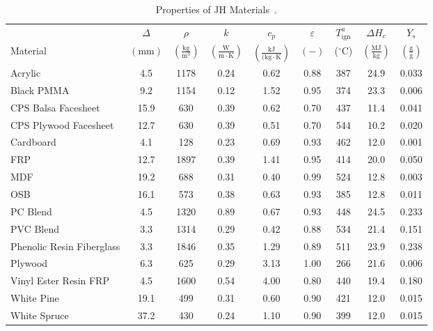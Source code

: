 \begin{table}[!h]
\caption[Properties of JH Materials]{Properties of JH Materials~\cite{Luo:FRA2019,Lattimer:NIJ19}.}
\centering
\begin{tabular}{|l|c|c|c|c|c|c|c|c|}
\hline
            & \centering$\Delta$& \centering$\rho$& \centering$k$& \centering$c_{p}$& \centering$\varepsilon$& \centering$T_{\mathrm{ign}}^{a}$&\centering$\Delta H_{c}$& $Y_{s}$ \\
Material    & \centering$\mathrm{\left(mm\right)}$ & \centering$\mathrm{\left(\frac{kg}{m^{3}}\right)}$ & \centering$\mathrm{\left(\frac{W}{m\cdot K}\right)}$ & \centering$\mathrm{\left(\frac{kJ}{(kg\cdot K}\right)}$ & \centering$\mathrm{( - )}$ &  \centering($\mathrm{^{\circ}C}$)   & \centering$\left(\mathrm{\frac{MJ}{kg}}\right)$ & $\mathrm{\left(\frac{g}{g}\right)}$ \\ \hline
\hline
Acrylic                                           & 4.5  & 1178 & 0.24 & 0.62 & 0.88 & 387 & 24.9 & 0.033 \\\hline
Black PMMA                                        & 9.2  & 1154 & 0.12 & 1.52 & 0.95 & 374 & 23.3 & 0.006 \\\hline
CPS Balsa Facesheet                               & 15.9 & 630  & 0.39 & 0.62 & 0.70 & 437 & 11.4 & 0.041 \\\hline
CPS Plywood Facesheet                             & 12.7 & 630  & 0.39 & 0.51 & 0.70 & 544 & 10.2 & 0.020 \\\hline
Cardboard                                         & 4.1  & 128  & 0.23 & 0.69 & 0.93 & 462 & 12.0 & 0.001 \\\hline
FRP                                               & 12.7 & 1897 & 0.39 & 1.41 & 0.95 & 414 & 20.0 & 0.050 \\\hline
MDF                                               & 19.2 & 688  & 0.31 & 0.40 & 0.99 & 524 & 12.8 & 0.003 \\\hline
OSB                                               & 16.1 & 573  & 0.38 & 0.63 & 0.93 & 385 & 12.8 & 0.011 \\\hline
PC Blend                                          & 4.5  & 1320 & 0.89 & 0.67 & 0.93 & 448 & 24.5 & 0.233 \\\hline
PVC Blend                                         & 3.3  & 1314 & 0.29 & 0.42 & 0.88 & 534 & 21.4 & 0.151 \\\hline
Phenolic Resin Fiberglass                         & 3.3  & 1846 & 0.35 & 1.29 & 0.89 & 511 & 23.9 & 0.238 \\\hline
Plywood                                           & 6.3  & 625  & 0.29 & 3.13 & 1.00 & 266 & 21.6 & 0.006 \\\hline
Vinyl Ester Resin FRP                             & 4.5  & 1600 & 0.54 & 4.00 & 0.80 & 440 & 19.4 & 0.180 \\\hline
White Pine                                        & 19.1 & 499  & 0.31 & 0.60 & 0.90 & 421 & 12.0 & 0.015 \\\hline
White Spruce                                      & 37.2 & 430  & 0.24 & 1.10 & 0.90 & 399 & 12.0 & 0.015 \\\hline
\end{tabular}
\label{Properties_JH_Materials_All}
\end{table}
